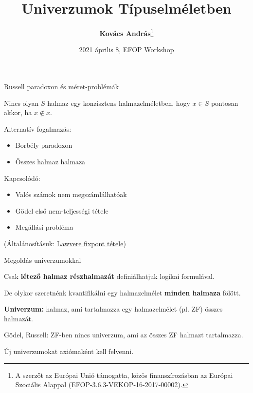 \documentclass[dvipsnames,10pt,aspectratio=169]{beamer}
\title{Univerzumok Típuselméletben}
\date{2021 április 8, EFOP Workshop}
\author{\normalsize{\vspace{-1em}\textbf{Kovács András}\footnote{A szerzőt az Európai Unió támogatta, közös finanszírozásban az Európai Szociális Alappal (EFOP-3.6.3-VEKOP-16-2017-00002).\vspace{0.5em}}}}
\institute{ELTE, Programozási Nyelvek és Fordítóprogramok tanszék\\Informatikai logika kutatócsoport\\ Témavezető: Kaposi Ambrus}
\begin{document}
\maketitle


\begin{frame}{Russell paradoxon és méret-problémák}

Nincs olyan $S$ halmaz egy konzisztens halmazelméletben, hogy $x \in S$ pontosan akkor, ha $x \notin
x$.
\vspace{1em}

Alternatív fogalmazás:
\begin{itemize}
  \item Borbély paradoxon
  \item Összes halmaz halmaza
\end{itemize}
\vspace{1em}

Kapcsolódó:
\begin{itemize}
  \item Valós számok nem megszámlálhatóak
  \item Gödel első nem-teljességi tétele
  \item Megállási probléma
\end{itemize}
\vspace{1em}

{\footnotesize (Általánosításuk: \href{https://arxiv.org/pdf/math/0305282.pdf}{Lawvere fixpont tétele)}}
\end{frame}


\begin{frame}{Megoldás univerzumokkal}

Csak \textbf{létező halmaz részhalmazát} definiálhatjuk logikai formulával.
\vspace{1em}

De olykor szeretnénk kvantifikálni egy halmazelmélet \textbf{minden halmaza}
fölött.
\vspace{1em}

\textbf{Univerzum:} halmaz, ami tartalmazza egy halmazelmélet (pl. ZF) összes halmazát.
\vspace{1em}

Gödel, Russell: ZF-ben nincs univerzum, ami az összes ZF halmazt tartalmazza.
\vspace{1em}

Új univerzumokat axiómaként kell felvenni.
\end{frame}
\end{document}
